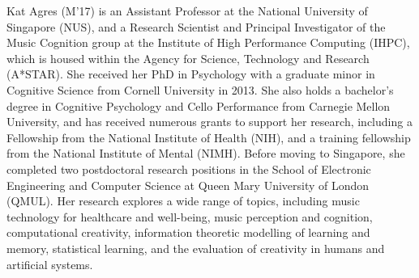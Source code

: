 \documentclass{ieeeaccess}
\begin{document}
\begin{IEEEbiography}{Kat Agres} (M'17) is an Assistant Professor at the National University of Singapore (NUS), and a Research Scientist and Principal Investigator of the Music Cognition group at the Institute of High Performance Computing (IHPC), which is housed within the Agency for Science, Technology and Research (A*STAR). She received her PhD in Psychology with a graduate minor in Cognitive Science from Cornell University in 2013. She also holds a bachelor's degree in Cognitive Psychology and Cello Performance from Carnegie Mellon University, and has received numerous grants to support her research, including a Fellowship from the National Institute of Health (NIH), and a training fellowship from the National Institute of Mental (NIMH). Before moving to Singapore, she completed two postdoctoral research positions in the School of Electronic Engineering and Computer Science at Queen Mary University of London (QMUL). Her research explores a wide range of topics, including music technology for healthcare and well-being, music perception and cognition, computational creativity, information theoretic modelling of learning and memory, statistical learning, and the evaluation of creativity in humans and artificial systems.
\end{IEEEbiography}
\vfill\null
\end{document}
